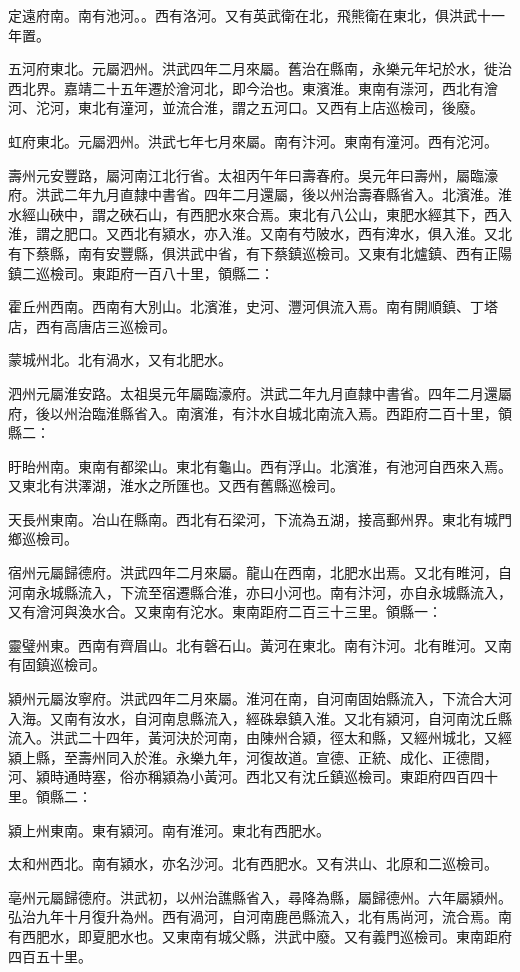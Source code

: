 定遠府南。南有池河。。西有洛河。又有英武衛在北，飛熊衛在東北，俱洪武十一年置。

五河府東北。元屬泗州。洪武四年二月來屬。舊治在縣南，永樂元年圮於水，徙治西北界。嘉靖二十五年遷於澮河北，即今治也。東濱淮。東南有漴河，西北有澮河、沱河，東北有潼河，並流合淮，謂之五河口。又西有上店巡檢司，後廢。

虹府東北。元屬泗州。洪武七年七月來屬。南有汴河。東南有潼河。西有沱河。

壽州元安豐路，屬河南江北行省。太祖丙午年曰壽春府。吳元年曰壽州，屬臨濠府。洪武二年九月直隸中書省。四年二月還屬，後以州治壽春縣省入。北濱淮。淮水經山硤中，謂之硤石山，有西肥水來合焉。東北有八公山，東肥水經其下，西入淮，謂之肥口。又西北有潁水，亦入淮。又南有芍陂水，西有渒水，俱入淮。又北有下蔡縣，南有安豐縣，俱洪武中省，有下蔡鎮巡檢司。又東有北爐鎮、西有正陽鎮二巡檢司。東距府一百八十里，領縣二：

霍丘州西南。西南有大別山。北濱淮，史河、灃河俱流入焉。南有開順鎮、丁塔店，西有高唐店三巡檢司。

蒙城州北。北有渦水，又有北肥水。

泗州元屬淮安路。太祖吳元年屬臨濠府。洪武二年九月直隸中書省。四年二月還屬府，後以州治臨淮縣省入。南濱淮，有汴水自城北南流入焉。西距府二百十里，領縣二：

盱眙州南。東南有都梁山。東北有龜山。西有浮山。北濱淮，有池河自西來入焉。又東北有洪澤湖，淮水之所匯也。又西有舊縣巡檢司。

天長州東南。冶山在縣南。西北有石梁河，下流為五湖，接高郵州界。東北有城門鄉巡檢司。

宿州元屬歸德府。洪武四年二月來屬。龍山在西南，北肥水出焉。又北有睢河，自河南永城縣流入，下流至宿遷縣合淮，亦曰小河也。南有汴河，亦自永城縣流入，又有澮河與渙水合。又東南有沱水。東南距府二百三十三里。領縣一：

靈璧州東。西南有齊眉山。北有磬石山。黃河在東北。南有汴河。北有睢河。又南有固鎮巡檢司。

潁州元屬汝寧府。洪武四年二月來屬。淮河在南，自河南固始縣流入，下流合大河入海。又南有汝水，自河南息縣流入，經硃皋鎮入淮。又北有潁河，自河南沈丘縣流入。洪武二十四年，黃河決於河南，由陳州合潁，徑太和縣，又經州城北，又經潁上縣，至壽州同入於淮。永樂九年，河復故道。宣德、正統、成化、正德間，河、潁時通時塞，俗亦稱潁為小黃河。西北又有沈丘鎮巡檢司。東距府四百四十里。領縣二：

潁上州東南。東有潁河。南有淮河。東北有西肥水。

太和州西北。南有潁水，亦名沙河。北有西肥水。又有洪山、北原和二巡檢司。

亳州元屬歸德府。洪武初，以州治譙縣省入，尋降為縣，屬歸德州。六年屬潁州。弘治九年十月復升為州。西有渦河，自河南鹿邑縣流入，北有馬尚河，流合焉。南有西肥水，即夏肥水也。又東南有城父縣，洪武中廢。又有義門巡檢司。東南距府四百五十里。

